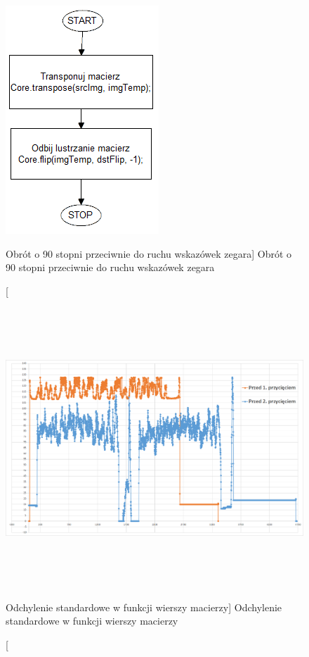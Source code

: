 \documentclass[a4paper,12pt]{article}
\begin{document}
    		    \begin{figure}[!ht]  
    			    \begin{center}
    				    \includegraphics[] {image//algorithm//cutBlackAreaPredv2.png} 
    			    \end{center}
    			    \caption
            			[Obrót o 90 stopni przeciwnie do ruchu wskazówek zegara]  
        	    		{Obrót o 90 stopni przeciwnie do ruchu wskazówek zegara}
    		    \end{figure}
			
		        
		        \newpage
		        
			    
    			\begin{figure}[!ht]  
    			    \begin{center}
    				    \includegraphics[height=10.5cm, frame] {image//practicalPart//stdDevCutBlackArea.png} 
    			    \end{center}
    			    \caption
            			[Odchylenie standardowe w funkcji wierszy macierzy] 
            			{Odchylenie standardowe w funkcji wierszy macierzy}  
            			\label{fig:stdDevAndLine}
    		    \end{figure}
			
\end{document}

